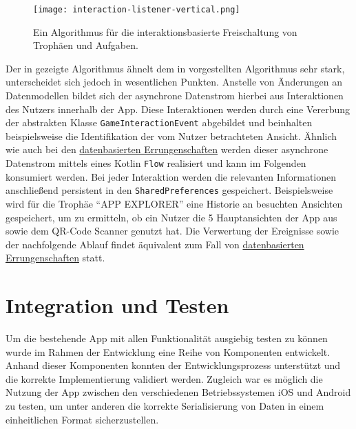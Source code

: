 \begin{figure}[H]
    \texttt{[image: interaction-listener-vertical.png]}
    \caption{Ein Algorithmus für die interaktionsbasierte Freischaltung von Trophäen und
    Aufgaben.}\label{fig:interaction-listener}
\end{figure}

Der in  gezeigte Algorithmus ähnelt dem in  vorgestellten Algorithmus sehr stark, unterscheidet sich jedoch in wesentlichen Punkten. Anstelle von Änderungen an Datenmodellen bildet sich der asynchrone Datenstrom hierbei aus Interaktionen des Nutzers innerhalb der App. Diese Interaktionen werden durch eine Vererbung der abstrakten Klasse \texttt{GameInteractionEvent} abgebildet und beinhalten beispielsweise die Identifikation der vom Nutzer betrachteten Ansicht. Ähnlich wie auch bei den \hyperref[subsection:gamification-repository-listener]{datenbasierten Errungenschaften} werden dieser asynchrone Datenstrom mittels eines Kotlin \texttt{Flow} realisiert und kann im Folgenden konsumiert werden. Bei jeder Interaktion werden die relevanten Informationen anschließend persistent in den \texttt{SharedPreferences} gespeichert. Beispielsweise wird für die Trophäe \enquote{APP EXPLORER} eine Historie an besuchten Ansichten gespeichert, um zu ermitteln, ob ein Nutzer die 5 Hauptansichten der App aus  sowie dem QR-Code Scanner genutzt hat. Die Verwertung der Ereignisse sowie der nachfolgende Ablauf findet äquivalent zum Fall von \hyperref[subsection:gamification-repository-listener]{datenbasierten Errungenschaften} statt. 


\section{Integration und Testen}

Um die bestehende App mit allen Funktionalität ausgiebig testen zu können wurde im Rahmen der Entwicklung eine Reihe von Komponenten entwickelt. Anhand dieser Komponenten konnten der Entwicklungsprozess unterstützt und die korrekte Implementierung validiert werden. Zugleich war es möglich die Nutzung der App zwischen den verschiedenen Betriebssystemen iOS und Android zu testen, um unter anderen die korrekte Serialisierung von Daten in einem einheitlichen Format sicherzustellen.

